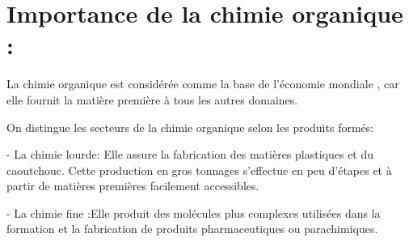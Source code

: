 \documentclass[12pt]{article}
\begin{document}
    \section{Importance de la chimie organique : }
    La chimie organique est considérée comme la base de l'économie mondiale , car elle fournit la matière première à
tous les autres domaines.

On distingue les secteurs de la chimie organique selon les produits formés:

  - La chimie lourde: Elle assure la fabrication des matières plastiques et du caoutchouc. Cette production en gros
tonnages s’effectue en peu d’étapes et à partir de matières premières facilement accessibles.

- La chimie fine :Elle produit des molécules plus complexes utilisées dans la formation et la fabrication de produits
pharmaceutiques ou parachimiques.
\end{document}
